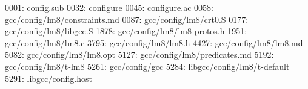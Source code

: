 \begin{textcode}
0001: config.sub
0032: configure
0045: configure.ac
0058: gcc/config/lm8/constraints.md
0087: gcc/config/lm8/crt0.S
0177: gcc/config/lm8/libgcc.S
1878: gcc/config/lm8/lm8-protos.h
1951: gcc/config/lm8/lm8.c
3795: gcc/config/lm8/lm8.h
4427: gcc/config/lm8/lm8.md
5082: gcc/config/lm8/lm8.opt
5127: gcc/config/lm8/predicates.md
5192: gcc/config/lm8/t-lm8
5261: gcc/config/gcc
5284: libgcc/config/lm8/t-default
5291: libgcc/config.host
\end{textcode}

